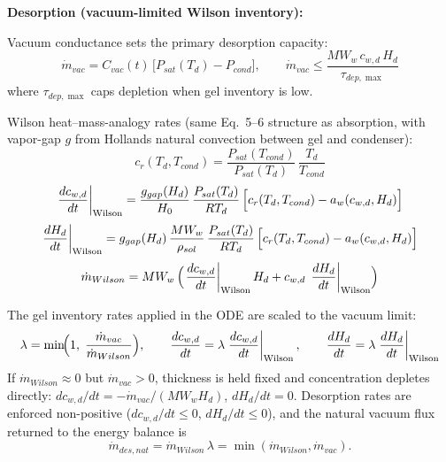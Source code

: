 \documentclass[11pt]{article}
\begin{document}
\textbf{Desorption (vacuum-limited Wilson inventory):}

Vacuum conductance sets the primary desorption capacity:
\begin{equation}
\dot{m}_{vac} = C_{vac}(t)\,\bigl[P_{sat}(T_d) - P_{cond}\bigr],
\qquad
\dot{m}_{vac} \le \frac{MW_w\,c_{w,d}\,H_d}{\tau_{dep,\max}}
\label{eq:massdes}
\end{equation}
where $\tau_{dep,\max}$ caps depletion when gel inventory is low.

Wilson heat--mass-analogy rates (same Eq.~5--6 structure as absorption, with vapor-gap $g$ from Hollands natural convection between gel and condenser):
\begin{equation}
c_r(T_d, T_{cond}) = \frac{P_{sat}(T_{cond})}{P_{sat}(T_d)}\,\frac{T_d}{T_{cond}}
\label{eq:crdes}
\end{equation}
\begin{equation}
\left.\frac{dc_{w,d}}{dt}\right|_{\mathrm{Wilson}}
= \frac{g_{gap}(H_d)}{H_0}\,\frac{P_{sat}(T_d)}{RT_d}\,
\Bigl[c_r(T_d, T_{cond}) - a_w(c_{w,d}, H_d)\Bigr]
\label{eq:massdes_cw}
\end{equation}
\begin{equation}
\left.\frac{dH_d}{dt}\right|_{\mathrm{Wilson}}
= g_{gap}(H_d)\,\frac{MW_w}{\rho_{sol}}\,\frac{P_{sat}(T_d)}{RT_d}\,
\Bigl[c_r(T_d, T_{cond}) - a_w(c_{w,d}, H_d)\Bigr]
\label{eq:massdes_H}
\end{equation}
\begin{equation}
\dot{m}_{Wilson} = MW_w\,\Bigl(
\left.\frac{dc_{w,d}}{dt}\right|_{\mathrm{Wilson}} H_d
+ c_{w,d}\,\left.\frac{dH_d}{dt}\right|_{\mathrm{Wilson}}\Bigr)
\label{eq:mwilson}
\end{equation}

The gel inventory rates applied in the ODE are scaled to the vacuum limit:
\begin{equation}
\lambda = \min\!\Bigl(1,\; \frac{\dot{m}_{vac}}{\dot{m}_{Wilson}}\Bigr),
\qquad
\frac{dc_{w,d}}{dt} = \lambda\left.\frac{dc_{w,d}}{dt}\right|_{\mathrm{Wilson}},
\qquad
\frac{dH_d}{dt} = \lambda\left.\frac{dH_d}{dt}\right|_{\mathrm{Wilson}}
\label{eq:massdes_scale}
\end{equation}
If $\dot{m}_{Wilson} \approx 0$ but $\dot{m}_{vac} > 0$, thickness is held fixed and concentration depletes directly:
$dc_{w,d}/dt = -\dot{m}_{vac}/(MW_w H_d)$, $dH_d/dt = 0$.
Desorption rates are enforced non-positive ($dc_{w,d}/dt \le 0$, $dH_d/dt \le 0$), and the natural vacuum flux returned to the energy balance is
\begin{equation}
\dot{m}_{des,nat} = \dot{m}_{Wilson}\,\lambda = \min(\dot{m}_{Wilson}, \dot{m}_{vac}).
\label{eq:mdesnat}
\end{equation}
\end{document}
